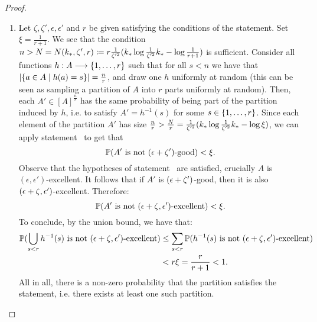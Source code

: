 \begin{lemma}
\begin{proof}
\begin{enumerate}[label=(\alph*), ref=\alph*]
                \item Let $\zeta, \zeta', \epsilon, \epsilon'$ and $r$ be given satisfying the conditions of the statement.
                    Set $\xi = \frac{1}{r + 1}$.
                    We see that the condition
                    $n > N = N( k_{*}, \zeta', r ) \coloneqq r \frac{1}{\zeta'^2}( k_* \log{\frac{1}{\zeta'^2}k_*} - \log{\frac{1}{r + 1}} )$
                    is sufficient.
                    Consider all functions $h: A \longrightarrow \{ 1, \dots, r \}$ such that
                    for all $s < n$ we have that $| \{ a \in A \mid h(a) = s \} | = \frac{n}{r}$,
                    and draw one $h$ uniformly at random (this can be seen as sampling a partition of $A$ into $r$ parts
                    uniformly at random).
                    Then, each $A' \in [A]^\frac{n}{r}$ has the same probability of being part of the partition
                    induced by $h$, i.e. to satisfy $A' = h^{-1}(s)$ for some $s \in \{ 1, \dots, r \}$.
                    Since each element of the partition $A'$ has size
                    $\frac{n}{r} > \frac{N}{r} = \frac{1}{\zeta'^2}( k_* \log{\frac{1}{\zeta'^2}k_*} - \log{\xi} )$,
                    we can apply statement ~to get that
                    \[
                        \mathbb{P}( A' \text{ is not } ( \epsilon + \zeta' )\text{-good} ) < \xi.
                    \]
                    Observe that the hypotheses of statement ~are satisfied,
                    crucially $A$ is $(\epsilon, \epsilon')$-excellent.
                    It follows that if $A'$ is $( \epsilon + \zeta' )$-good, then it is also $( \epsilon + \zeta, \epsilon' )$-excellent.
                    Therefore:
                    \[
                        \mathbb{P}( A' \text{ is not } ( \epsilon + \zeta, \epsilon' )\text{-excellent} ) < \xi.
                    \]
                    To conclude, by the union bound, we have that:
                    \begin{align*}
                        \mathbb{P}( \bigcup_{s < r} h^{-1}(s) \text{ is not } ( \epsilon + \zeta, \epsilon' )\text{-excellent} )
                            & \leq \sum_{s < r} \mathbb{P}( h^{-1}(s) \text{ is not } ( \epsilon + \zeta, \epsilon' )\text{-excellent} ) \\
                            & < r \xi = \frac{r}{r+1} < 1.
                    \end{align*}
                    All in all, there is a non-zero probability that the partition satisfies the statement,
                    i.e. there exists at least one such partition. \qedhere
                \end{enumerate}
            \end{proof}
        \end{lemma}

